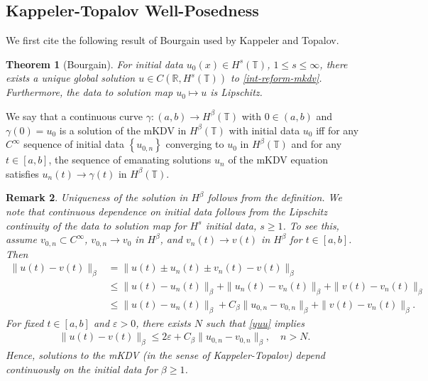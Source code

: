 \documentclass[12pt,reqno]{amsart}
\numberwithin{equation}{section}  %
\newcommand{\rr}{\mathbb{R}}
\newcommand{\ci}{\mathbb{T}}
\newcommand{\ee}{\varepsilon}
\newtheorem{theorem}{Theorem}[section]
\newtheorem{remark}[theorem]{Remark}
\begin{document}
  \subsection{Kappeler-Topalov \cite{Kappeler:2006uq} Well-Posedness} 
  \label{ssec:kap-wp}
  We first cite the following result of Bourgain \cite{Bourgain-Fourier-transfo} used
  by Kappeler and Topalov.
  \begin{theorem}[Bourgain]
    For initial data $u_{0}(x) \in H^{s}(\ci)$, $1\le s \le \infty$, 
    there exists a unique global solution $u \in C(\rr, H^{s}(\ci))$ to
    \eqref{int-reform-mkdv}. Furthermore, the data to solution map $u_{0}
    \mapsto u$ is Lipschitz.
    \label{thm:bour}
  \end{theorem}
  We say that a continuous curve $\gamma: (a,b) \to H^{\beta}(\ci)$ with $0 \in
  (a,b)$ and $\gamma(0) = u_{0}$ is a solution of the mKDV in
  $H^{\beta}(\ci)$ with initial data $u_{0}$ iff for any $C^{\infty}$ sequence
  of initial data $\left\{ u_{0,n} \right\}$ converging to $u_{0}$ in
  $H^{\beta}(\ci)$ and for any $t \in [a,b]$, the sequence of emanating
  solutions $u_{n}$ of the mKDV equation satisfies $u_{n}(t) \to
  \gamma(t)$ in $H^{\beta}(\ci)$.
  \begin{framed}
  \begin{remark}
    Uniqueness of the solution in $H^{\beta}$ follows from the definition. We
    note that continuous dependence on initial data follows from the Lipschitz
    continuity of the data to solution map for $H^{s}$ initial data, $s \ge 1$.
    To see this, assume $v_{0,n} \subset C^{\infty}$,
  $v_{0,n} \to v_{0}$ in $H^{\beta}$, and $v_{n}(t) \to v(t)$ in $H^{\beta}$ for
  $t \in [a,b]$. Then
  \begin{equation}
    \label{yuu}
  \begin{split}
    \|u(t) - v(t) \|_{\beta} 
    & = \|u(t) \pm u_{n}(t) \pm v_{n}(t) - v(t) \|_{\beta}
    \\
    & \le \| u(t) - u_{n}(t) \|_{\beta} + \| u_{n}(t) - v_{n}(t) \|_{\beta} + \|
    v(t) -
    v_{n}(t) \|_{\beta}
    \\
    & \le \| u(t) - u_{n}(t) \|_{\beta} + C_{\beta} \| u_{0,n} - v_{0,n}
    \|_{\beta} + \| v(t) -
    v_{n}(t) \|_{\beta}.
  \end{split}
  \end{equation}
  For fixed $t \in [a,b]$ and $\ee > 0$, there exists $N$ such that
  \eqref{yuu} implies
  \begin{equation*}
  \begin{split}
  \|u(t) - v(t) \|_{\beta} 
       \le 2 \ee +  C_{\beta} \| u_{0,n} - v_{0,n} \|_{\beta}, \quad n > N.
     \end{split}
  \end{equation*}
  Hence, solutions to the mKDV (in the sense of Kappeler-Topalov) depend
  continuously on the initial data for $\beta \ge 1$.
  \label{rem:uniqueness}
  \end{remark}
  \end{framed}
\end{document}
